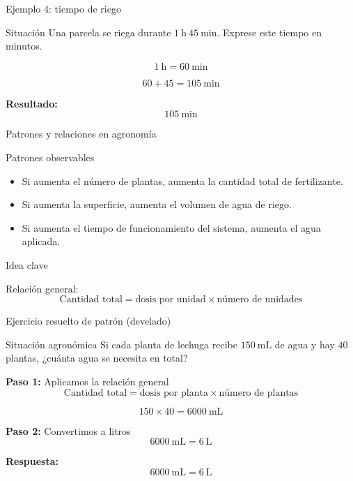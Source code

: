 \documentclass[aspectratio=169,10pt]{beamer}
\newcommand{\idea}[1]{
	\begin{block}{Idea clave}
		#1
	\end{block}
}
\begin{document}
	\begin{frame}{Ejemplo 4: tiempo de riego}
		\begin{block}{Situación}
			Una parcela se riega durante \(1\ \text{h}\ 45\ \text{min}\). Exprese este tiempo en minutos.
		\end{block}
		
		\pause
		\[
		1\ \text{h} = 60\ \text{min}
		\]
		
		\pause
		\[
		60 + 45 = 105\ \text{min}
		\]
		
		\pause
		\textbf{Resultado:}
		\[
		\boxed{105\ \text{min}}
		\]
	\end{frame}
	
	\begin{frame}{Patrones y relaciones en agronomía}
		\begin{block}{Patrones observables}
			\begin{itemize}[<+->]
				\item Si aumenta el número de plantas, aumenta la cantidad total de fertilizante.
				\item Si aumenta la superficie, aumenta el volumen de agua de riego.
				\item Si aumenta el tiempo de funcionamiento del sistema, aumenta el agua aplicada.
			\end{itemize}
		\end{block}
		
		\pause
		\idea{
			Relación general:
			\[
			\text{Cantidad total} = \text{dosis por unidad} \times \text{número de unidades}
			\]
		}
	\end{frame}
	
	\begin{frame}{Ejercicio resuelto de patrón (develado)}
		\begin{block}{Situación agronómica}
			Si cada planta de lechuga recibe \(150\ \text{mL}\) de agua y hay \(40\) plantas, ¿cuánta agua se necesita en total?
		\end{block}
		
		\pause
		\textbf{Paso 1:} Aplicamos la relación general
		\[
		\text{Cantidad total} = \text{dosis por planta} \times \text{número de plantas}
		\]
		
		\pause
		\[
		150 \times 40 = 6000\ \text{mL}
		\]
		
		\pause
		\textbf{Paso 2:} Convertimos a litros
		\[
		6000\ \text{mL} = 6\ \text{L}
		\]
		
		\pause
		\textbf{Respuesta:}
		\[
		\boxed{6000\ \text{mL} = 6\ \text{L}}
		\]
	\end{frame}
	
\end{document}
